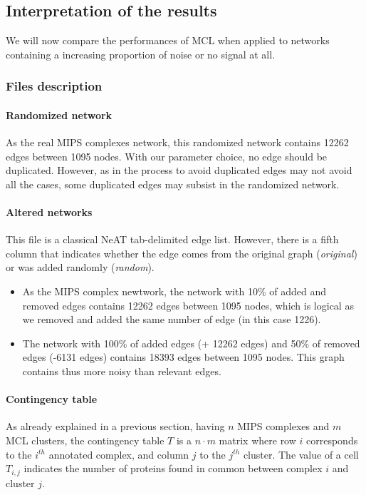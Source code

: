 \subsection{Interpretation of the results}

We will now compare the performances of MCL when applied to networks containing a increasing proportion of noise or no signal at all.

\subsubsection{Files description}

\paragraph{Randomized network}
As the real MIPS complexes network, this randomized network contains 12262 edges between 1095 nodes. With our parameter choice, no edge should be duplicated. However, as in  the process to avoid duplicated edges may not avoid all the cases, some duplicated edges may subsist in the randomized network. 

\paragraph{Altered networks}
  This file is a classical NeAT tab-delimited edge list. However, there is a fifth column that indicates
  whether the edge comes from the original graph (\textit{original}) or was added randomly (\textit{random}).
\begin{itemize}
 \item As the MIPS complex newtwork, the network with 10\% of added and removed edges contains 12262 edges between 1095 nodes, which is logical as we removed and added the same number of edge (in this case 1226).
 \item The network with 100\% of added edges (+ 12262 edges) and 50\% of removed edges (-6131 edges) contains 18393 edges between 1095 nodes. This graph contains thus more noisy than relevant edges.
\end{itemize}


\paragraph{Contingency table}
As already explained in a previous section, having $n$ MIPS complexes and $m$ MCL clusters, the contingency table $T$ is
a $n \cdot m$ matrix where row $i$ corresponds to the $i^{th}$
annotated complex, and column $j$ to the $j^{th}$ cluster. The value
of a cell $T_{i,j}$ indicates the number of proteins found in common
between complex $i$ and cluster $j$.

